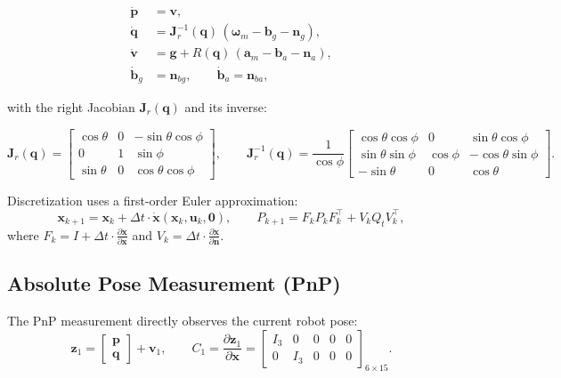 \documentclass[11pt,a4paper]{article}
\begin{document}
\begin{align*}
\dot{\mathbf{p}} &= \mathbf{v}, \\
\dot{\mathbf{q}} &= \mathbf{J}_r^{-1}(\mathbf{q})\,(\boldsymbol{\omega}_m - \mathbf{b}_g - \mathbf{n}_g), \\
\dot{\mathbf{v}} &= \mathbf{g} + R(\mathbf{q})\,(\mathbf{a}_m - \mathbf{b}_a - \mathbf{n}_a), \\
\dot{\mathbf{b}}_g &= \mathbf{n}_{bg}, \qquad
\dot{\mathbf{b}}_a = \mathbf{n}_{ba},
\end{align*}

with the right Jacobian \(\mathbf{J}_r(\mathbf{q})\) and its inverse:

\[
\mathbf{J}_r(\mathbf{q}) =
\begin{bmatrix}
\cos\theta & 0 & -\sin\theta\cos\phi \\
0 & 1 & \sin\phi \\
\sin\theta & 0 & \cos\theta\cos\phi
\end{bmatrix},\qquad
\mathbf{J}_r^{-1}(\mathbf{q}) =
\frac{1}{\cos\phi}
\begin{bmatrix}
\cos\theta\cos\phi & 0 & \sin\theta\cos\phi \\
\sin\theta\sin\phi & \cos\phi & -\cos\theta\sin\phi \\
-\sin\theta & 0 & \cos\theta
\end{bmatrix}.
\]

Discretization uses a first-order Euler approximation:
\[
\mathbf{x}_{k+1} = \mathbf{x}_k + \Delta t \cdot \dot{\mathbf{x}}(\mathbf{x}_k, \mathbf{u}_k, \mathbf{0}),
\qquad
P_{k+1} = F_k P_k F_k^\top + V_k Q_t V_k^\top,
\]
where \(F_k = I + \Delta t \cdot \frac{\partial \dot{\mathbf{x}}}{\partial \mathbf{x}}\) and
\(V_k = \Delta t \cdot \frac{\partial \dot{\mathbf{x}}}{\partial \mathbf{n}}\).

\subsection{Absolute Pose Measurement (PnP)}
\label{sec:pnp}

The PnP measurement directly observes the current robot pose:
\[
\mathbf{z}_1 = \begin{bmatrix} \mathbf{p} \\ \mathbf{q} \end{bmatrix} + \mathbf{v}_1,
\qquad
C_1 = \frac{\partial \mathbf{z}_1}{\partial \mathbf{x}} = \begin{bmatrix} I_3 & 0 & 0 & 0 & 0 \\ 0 & I_3 & 0 & 0 & 0 \end{bmatrix}_{6\times15}.
\]
\end{document}
